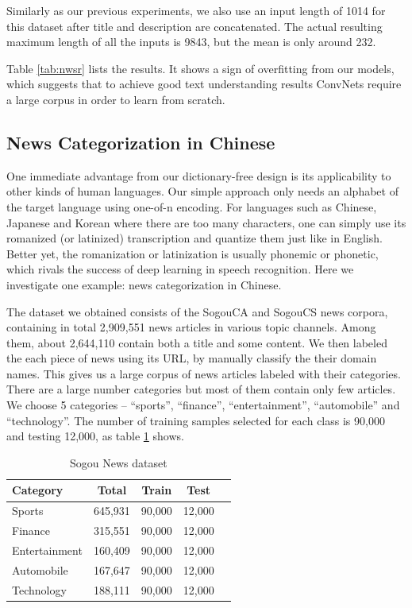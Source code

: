 \documentclass{article}
\begin{document}
\begin{CJK}{UTF8}{gbsn}
Similarly as our previous experiments, we also use an input length of 1014 for this dataset after title and description are concatenated. The actual resulting maximum length of all the inputs is 9843, but the mean is only around 232.

Table \ref{tab:nwsr} lists the results. It shows a sign of overfitting from our models, which suggests that to achieve good text understanding results ConvNets require a large corpus in order to learn from scratch.

\subsection{News Categorization in Chinese}

One immediate advantage from our dictionary-free design is its applicability to other kinds of human languages. Our simple approach only needs an alphabet of the target language using one-of-n encoding. For languages such as Chinese, Japanese and Korean where there are too many characters, one can simply use its romanized (or latinized) transcription and quantize them just like in English. Better yet, the romanization or latinization is usually phonemic or phonetic, which rivals the success of deep learning in speech recognition\cite{HCCCDEPSSCN14}. Here we investigate one example: news categorization in Chinese.

The dataset we obtained consists of the SogouCA and SogouCS news corpora\cite{WZMR08}, containing in total 2,909,551 news articles in various topic channels. Among them, about 2,644,110 contain both a title and some content. We then labeled the each piece of news using its URL, by manually classify the their domain names. This gives us a large corpus of news articles labeled with their categories. There are a large number categories but most of them contain only few articles. We choose 5 categories -- ``sports'', ``finance'', ``entertainment'', ``automobile'' and ``technology''. The number of training samples selected for each class is 90,000 and testing 12,000, as table \ref{tab:sogd} shows.

\begin{table}[ht]
  \caption{Sogou News dataset}
  \label{tab:sogd}
  \begin{center}
    \begin{tabular}{lcccc}
      \hline
      \abovespace\belowspace
      Category & Total & Train & Test \\
      \hline
      \abovespace
      Sports & 645,931 & 90,000 & 12,000 \\
      Finance & 315,551 & 90,000 & 12,000 \\
      Entertainment & 160,409 & 90,000 & 12,000 \\
      Automobile & 167,647 & 90,000 & 12,000 \\
      \belowspace
      Technology & 188,111 & 90,000 & 12,000 \\
      \hline
    \end{tabular}
  \end{center}
\end{table}


\end{CJK}
\end{document}
